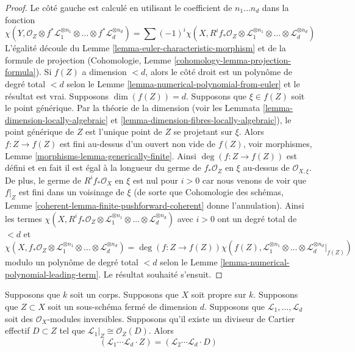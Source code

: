 \begin{proof}
Le côté gauche est calculé en utilisant le
coefficient de $n_1 \ldots n_d$ dans la fonction
$$
\chi(Y, \mathcal{O}_Z \otimes f^*\mathcal{L}_1^{\otimes n_1} \otimes
\ldots \otimes f^*\mathcal{L}_d^{\otimes n_d}) =
\sum (-1)^i
\chi(X, R^if_*\mathcal{O}_Z \otimes
\mathcal{L}_1^{\otimes n_1} \otimes \ldots \otimes
\mathcal{L}_d^{\otimes n_d})
$$
L'égalité découle du Lemme
\ref{lemma-euler-characteristic-morphism} et de la formule
de projection (Cohomologie, Lemme
\ref{cohomology-lemma-projection-formula}). Si $f(Z)$ a
dimension $< d$, alors le côté droit est un polynôme de
degré total $< d$ selon le Lemme
\ref{lemma-numerical-polynomial-from-euler} et le résultat
est vrai. Supposons $\dim(f(Z)) = d$. Supposons que $\xi \in
f(Z)$ soit le point générique. Par la théorie de la dimension
(voir les Lemmata \ref{lemma-dimension-locally-algebraic} et
\ref{lemma-dimension-fibres-locally-algebraic}), le point
générique de $Z$ est l'unique point de $Z$ se projetant sur
$\xi$. Alors $f : Z \to f(Z)$ est fini au-dessus d'un ouvert
non vide de $f(Z)$, voir morphismes, Lemme
\ref{morphisms-lemma-generically-finite}. Ainsi $\deg(f : Z \to
f(Z))$ est défini et en fait il est égal à la longueur du germe
de $f_*\mathcal{O}_Z$ en $\xi$ au-dessus de $\mathcal{O}_{X,
\xi}$. De plus, le germe de $R^if_*\mathcal{O}_X$ en $\xi$ est
nul pour $i > 0$ car nous venons de voir que $f|_Z$ est fini
dans un voisinage de $\xi$ (de sorte que Cohomologie des
schémas, Lemme \ref{coherent-lemma-finite-pushforward-coherent}
donne l'annulation). Ainsi les termes $\chi(X, R^if_*\mathcal{O}_Z
\otimes \mathcal{L}_1^{\otimes n_1} \otimes \ldots \otimes
\mathcal{L}_d^{\otimes n_d})$ avec $i > 0$ ont un degré total de $< d$ et
$$
\chi(X, f_*\mathcal{O}_Z \otimes
\mathcal{L}_1^{\otimes n_1} \otimes \ldots \otimes
\mathcal{L}_d^{\otimes n_d})
=
\deg(f : Z \to f(Z)) \chi(f(Z),
\mathcal{L}_1^{\otimes n_1} \otimes \ldots \otimes
\mathcal{L}_d^{\otimes n_d}|_{f(Z)})
$$
modulo un polynôme de degré total $< d$
selon le Lemme
\ref{lemma-numerical-polynomial-leading-term}. Le résultat souhaité s'ensuit.
\end{proof}

\begin{lemma}
\label{lemma-numerical-intersection-effective-Cartier-divisor}
Supposons que $k$ soit un corps. Supposons que $X$ soit propre sur $k$.
Supposons que $Z \subset X$ soit un sous-schéma fermé de dimension $d$.
Supposons que $\mathcal{L}_1, \ldots, \mathcal{L}_d$ soit des
$\mathcal{O}_X$-modules inversibles. Supposons qu'il existe un diviseur de
Cartier effectif $D \subset Z$ tel que $\mathcal{L}_1|_Z \cong \mathcal{O}_Z(D)$. Alors
$$
(\mathcal{L}_1 \cdots \mathcal{L}_d \cdot Z) =
(\mathcal{L}_2 \cdots \mathcal{L}_d \cdot D)
$$
\end{lemma}

